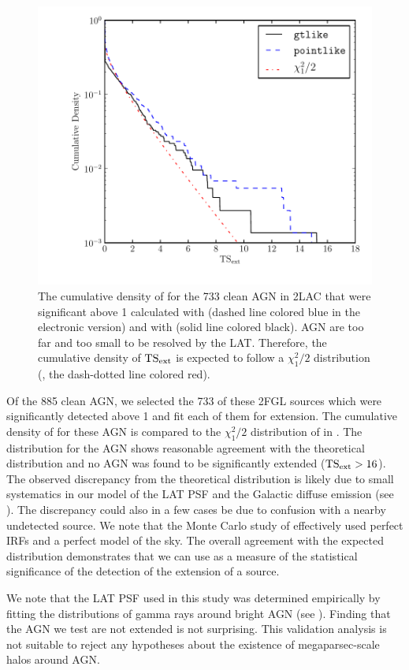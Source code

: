 \begin{figure}[htbp]
  \includegraphics{source_plots/agn_color.pdf}
  \caption{The cumulative density of \tsext for the 733 clean AGN in 2LAC
  that were significant above 1 \gev calculated with \pointlike (dashed
  line colored blue in the electronic version) and with \gtlike (solid
  line colored black).  AGN are too far and too small to be resolved
  by the LAT. Therefore, the cumulative density of $\mathrm{TS}_\mathrm{ext}$ is expected
  to follow a $\chi^2_1/2$ distribution (,
  the dash-dotted line colored red).}
\end{figure}

Of the 885 clean AGN, we selected the 733 of these 2FGL sources which
were significantly detected above 1 \gev and fit each of them for
extension.  The cumulative density of \tsext for these AGN is compared
to the $\chi^2_1/2$ distribution of 
in .  The \tsext distribution for the AGN shows
reasonable agreement with the theoretical distribution and no AGN
was found to be significantly extended ($\mathrm{TS}_\mathrm{ext}>16$).  The observed
discrepancy from the theoretical distribution is likely due to small
systematics in our model of the LAT PSF and the Galactic diffuse emission
(see ).  The discrepancy could
also in a few cases be due to confusion with a nearby undetected source.
We note that the Monte Carlo study of 
effectively used perfect IRFs and a perfect model of the sky.  The overall
agreement with the expected distribution demonstrates that we can use
\tsext as a measure of the statistical significance of the detection of
the extension of a source.

We note that the LAT PSF used in this study was determined empirically
by fitting the distributions of gamma rays around bright AGN (see
). Finding that the AGN we test
are not extended is not surprising.  This validation analysis is not
suitable to reject any hypotheses about the existence of megaparsec-scale
halos around AGN.
